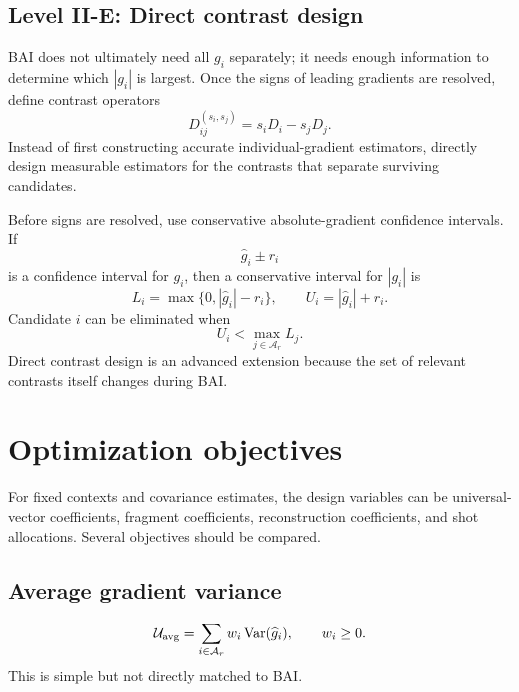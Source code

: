 \documentclass[11pt]{article}
\newcommand{\Var}{\operatorname{Var}}
\newcommand{\Aset}{\mathcal A}
\begin{document}
\subsection{Level II-E: Direct contrast design}

BAI does not ultimately need all $g_i$ separately; it needs enough information to determine which $|g_i|$ is largest.  Once the signs of leading gradients are resolved, define contrast operators
\begin{equation}
  D_{ij}^{(s_i,s_j)}=s_iD_i-s_jD_j.
  \label{eq:contrast-operator}
\end{equation}
Instead of first constructing accurate individual-gradient estimators, directly design measurable estimators for the contrasts that separate surviving candidates.

Before signs are resolved, use conservative absolute-gradient confidence intervals.  If
\begin{equation}
  \widehat g_i\pm r_i
\end{equation}
is a confidence interval for $g_i$, then a conservative interval for $|g_i|$ is
\begin{equation}
  L_i=\max\{0,|\widehat g_i|-r_i\},
  \qquad
  U_i=|\widehat g_i|+r_i.
  \label{eq:absolute-ci}
\end{equation}
Candidate $i$ can be eliminated when
\begin{equation}
  U_i<\max_{j\in\Aset_r}L_j.
  \label{eq:eliminate}
\end{equation}
Direct contrast design is an advanced extension because the set of relevant contrasts itself changes during BAI.

\section{Optimization objectives}

For fixed contexts and covariance estimates, the design variables can be universal-vector coefficients, fragment coefficients, reconstruction coefficients, and shot allocations.  Several objectives should be compared.

\subsection{Average gradient variance}

\begin{equation}
  \mathcal U_{\rm avg}
  =\sum_{i\in\Aset_r}w_i\Var(\widehat g_i),
  \qquad w_i\ge0.
  \label{eq:avg-var}
\end{equation}
This is simple but not directly matched to BAI.
\end{document}
